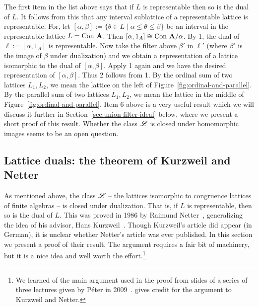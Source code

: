 \begin{remarks}
  The first item in the list above says that if $L$ is representable then so is the dual of $L$. 
  It follows from this that any interval sublattice of a representable lattice is
  representable.  For, let $[\alpha, \beta] := \{\theta \in L \mid \alpha \leq
  \theta \leq \beta\}$ be an interval in the representable lattice $L= \operatorname{Con\,}\mathbf{A}$.
  Then $[\alpha, 1_A] \cong \operatorname{Con\,} \mathbf{A}/\alpha$. By 1, the dual of $\ell := [\alpha, 1_A]$ is
  representable. %
  Now take the filter above $\beta'$ in $\ell'$ (where $\beta'$ is the
  image of $\beta$ under dualization) and we obtain a representation of a
  lattice isomorphic to the dual of $[\alpha, \beta]$.  Apply 1
  again and we have the desired representation of $[\alpha, \beta]$.  Thus
  2 follows from 1.
  By the ordinal sum of two lattices $L_1, L_2$, we mean the lattice
  on the left of Figure~\ref{fig:ordinal-and-parallel}.
  By the parallel sum of two lattices $L_1, L_2$, we mean the lattice
  in the middle of Figure~\ref{fig:ordinal-and-parallel}.
  Item 6 above is a very useful result which we will discuss it further in
  Section~\ref{sec:union-filter-ideal} below, where we present a short proof of
  this result. 
  Whether the class $\mathscr{L}$ is closed under homomorphic images
  seems to be an open question. 
\end{remarks}

\subsection{Lattice duals: the theorem of Kurzweil and Netter}
\label{sec:duals-interv-subl-detail}
As mentioned above, 
the class $\mathscr{L}$ -- the lattices isomorphic to congruence lattices of finite
algebras -- is closed under
dualization.
That is, if $L$ is representable, then so is the dual of $L$. This was proved in
1986 by Raimund Netter~\cite{Netter:1986}, generalizing the idea of his advisor,
Hans Kurzweil~\cite{Kurzweil:1985}. 
Though Kurzweil's article did appear (in German), it is unclear whether Netter's
article was ever published.
In this section we present a proof of their result.
The argument requires a fair bit of machinery, but it is a nice idea and
well worth the effort.\footnote{We learned 
  of the main argument used in the proof from slides of a series of three
  lectures given by P{\'e}ter \Palfy in 2009~\cite{Palfy:2009}.
  \Palfy gives credit for the argument to Kurzweil and Netter.} 

